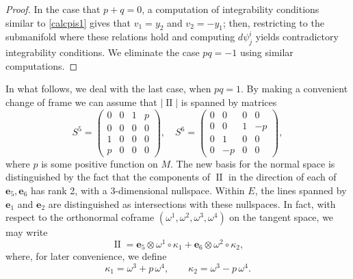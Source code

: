 \documentclass[12pt,reqno]{amsart}
\theoremstyle{definition}
\theoremstyle{remark}
\begin{document}
\begin{proof}
In the case that $p+q=0$, a computation of integrability conditions similar to \eqref{calcpis1}
gives that $v_1=y_2$ and $v_2=-y_1$; then, restricting to the submanifold where these relations hold and computing $d\psi^i_j$
yields contradictory integrability conditions.  We eliminate the case $pq=-1$ using similar computations.
\end{proof}

In what follows, we deal with the last case, when $pq=1$.  By making a convenient change of frame
we can assume that $|{\operatorname{II}}|$ is spanned by matrices
$$S^5 = \begin{pmatrix} 0 & 0 & 1 & p\\ 0 & 0 & 0 & 0\\ 1 & 0 & 0 & 0 \\ p & 0 & 0 & 0 \end{pmatrix},\quad
S^6 = \begin{pmatrix} 0 & 0& 0 & 0 \\ 0 & 0 & 1 & -p \\ 0 & 1 & 0 & 0 \\ 0 & -p & 0 & 0 \end{pmatrix},$$
where $p$ is some positive function on $M$.
The new basis for the normal space  is distinguished by the fact that the components
of ${\operatorname{II}}$ in the direction of each of ${\mathbf e}_5, {\mathbf e}_6$ has rank 2, with a 3-dimensional nullspace.
Within $E$, the lines spanned by ${\mathbf e}_1$ and ${\mathbf e}_2$ are distinguished as intersections with these nullspaces.
In fact, with respect to the orthonormal coframe $({\omega}^1, {\omega}^2, {\omega}^3, {\omega}^4)$
on the tangent space, we may write
$${\operatorname{II}} = {\mathbf e}_5 \otimes {\omega}^1 \circ \kappa_1 + {\mathbf e}_6 \otimes {\omega}^2 \circ \kappa_2,$$
where, for later convenience, we define
$$\kappa_1 = {\omega}^3 +p\,{\omega}^4, \qquad \kappa_2 = {\omega}^3 - p\,{\omega}^4.$$
\end{document}
